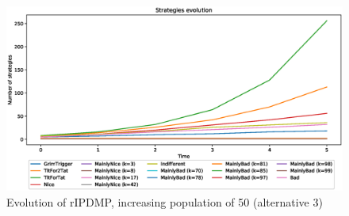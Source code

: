 \documentclass[journal,10pt,twoside]{IEEEtran}
\begin{document}
\begin{figure}
    \centering
    \includegraphics[width=.7\columnwidth]{../img/ripdmp-incr/alt3/ripdmp-evolution-increasing-pop-50}
    \caption{Evolution of rIPDMP, increasing population of 50 (alternative 3)}
    \label{fig:incrRa3}
\end{figure}



\end{document}
